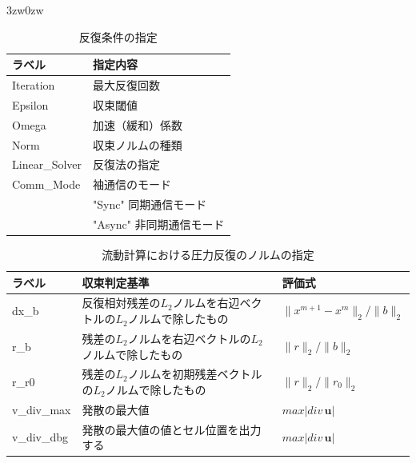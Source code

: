 \begin{indentation}{3zw}{0zw}
\begin{table}[htdp]
\caption{反復条件の指定}
\begin{center}
\small
\begin{tabular}{ll} \toprule
ラベル & 指定内容\\ \midrule
Iteration & 最大反復回数\\
Epsilon & 収束閾値\\
Omega & 加速（緩和）係数\\
Norm & 収束ノルムの種類\\ 
Linear\_Solver & 反復法の指定\\ \hline
Comm\_Mode & 袖通信のモード\\
 & "Sync" 同期通信モード\\
 & "Async" 非同期通信モード\\ \bottomrule
\end{tabular}
\end{center}
\label{tbl:flow_itr}
\end{table}

\begin{table}[htdp]
\caption{流動計算における圧力反復のノルムの指定}
\begin{center}
\small
\begin{tabular}{lll} \toprule
ラベル & 収束判定基準 & 評価式\\ \midrule
dx\_b & 反復相対残差の$L_2$ノルムを右辺ベクトルの$L_2$ノルムで除したもの & $\|x^{m+1}-x^m \|_2 \bigg / \|b\|_2$\\
\vspace{2mm}
r\_b & 残差の$L_2$ノルムを右辺ベクトルの$L_2$ノルムで除したもの & $\| r \|_2 \bigg / \|b\|_2$\\
\vspace{2mm}
r\_r0 & 残差の$L_2$ノルムを初期残差ベクトルの$L_2$ノルムで除したもの & $\|r\|_2 \bigg / \|r_0\|_2$\\ 
v\_div\_max & 発散の最大値 & $max\left|div\,\bm{u}\right|$\\
\vspace{2mm}
v\_div\_dbg & 発散の最大値の値とセル位置を出力する\footnotemark[1] & $max\left|div\,\bm{u}\right|$\\
\bottomrule
\end{tabular}
\end{center}
\label{tbl:norm-type}
\end{table}


\end{indentation}
